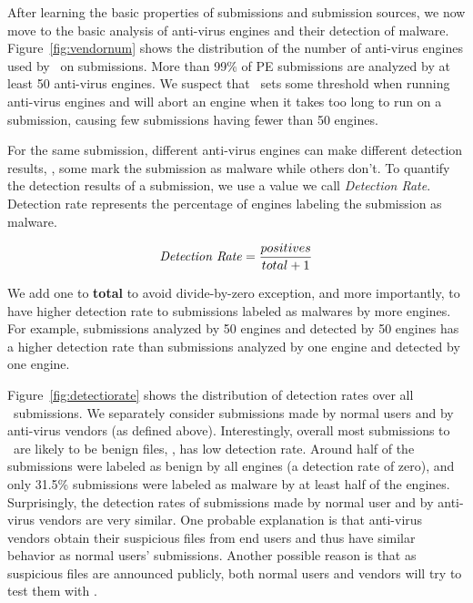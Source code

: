 

After learning the basic properties of submissions and submission sources, 
we now move to the basic analysis of anti-virus engines and their detection of malware.
Figure~\ref{fig:vendornum} shows the distribution of the number of anti-virus engines used by \vt\ on submissions. 
More than 99\% of PE submissions are analyzed by at least 50 anti-virus engines. 
We suspect that \vt\ sets some threshold when running anti-virus engines and 
will abort an engine when it takes too long to run on a submission,
causing few submissions having fewer than 50 engines.

For the same submission, different anti-virus engines can make different detection results, \ie, some mark the submission as malware while others don't.
To quantify the detection results of a submission,
we use a value we call {\em Detection Rate}.
Detection rate represents the percentage of engines labeling the submission as malware. 

$$ \textrm{\textit{Detection Rate}} = \dfrac{positives}{total + 1}$$

We add one to {\bf total} to avoid divide-by-zero exception, and more importantly, 
to have higher detection rate to submissions labeled as malwares by more engines.
For example, submissions analyzed by 50 engines and detected by 50 engines 
has a higher detection rate 
than submissions analyzed by one engine and detected by one engine. 

Figure~\ref{fig:detectiorate} shows the distribution of detection rates over all \pe\ submissions.
We separately consider submissions made by normal users and by anti-virus vendors 
(as defined above).
Interestingly, overall most submissions to \vt\ are likely to be benign files, \ie, has low detection rate.
Around half of the submissions were labeled as benign by all engines (a detection rate of zero),
and only 31.5\% submissions were labeled as malware by at least half of the engines.
Surprisingly, the detection rates of submissions made by normal user and by anti-virus vendors are very similar.
One probable explanation is that anti-virus vendors obtain their suspicious files 
from end users and thus have similar behavior as normal users' submissions.
Another possible reason is that as suspicious files are announced publicly, 
both normal users and vendors will try to test them with \vt.

